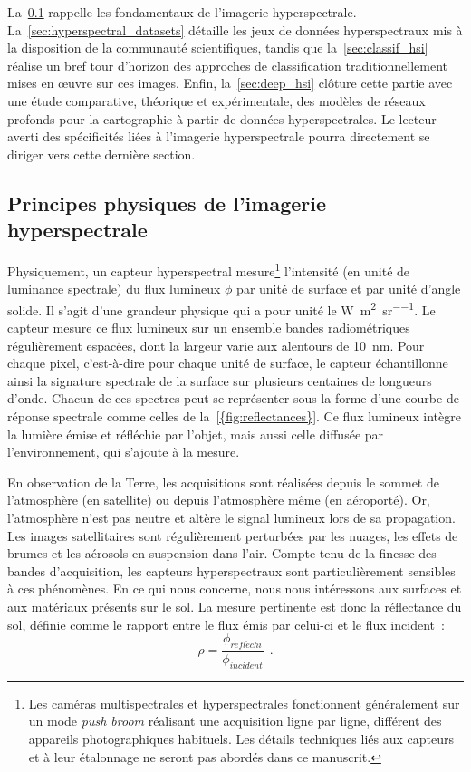 La~\cref{sec:principes_hsi} rappelle les fondamentaux de l'imagerie hyperspectrale. La~\cref{sec:hyperspectral_datasets} détaille les jeux de données hyperspectraux mis à la disposition de la communauté scientifiques, tandis que la~\cref{sec:classif_hsi} réalise un bref tour d'horizon des approches de classification traditionnellement mises en \oe{}uvre sur ces images. Enfin, la~\cref{sec:deep_hsi} clôture cette partie avec une étude comparative, théorique et expérimentale, des modèles de réseaux profonds pour la cartographie à partir de données hyperspectrales. Le lecteur averti des spécificités liées à l'imagerie hyperspectrale pourra directement se diriger vers cette dernière section.

\subsection{Principes physiques de l'imagerie hyperspectrale}
\label{sec:principes_hsi}

Physiquement, un capteur hyperspectral mesure\footnote{Les caméras multispectrales et hyperspectrales fonctionnent généralement sur un mode \emph{push broom} réalisant une acquisition ligne par ligne, différent des appareils photographiques habituels. Les détails techniques liés aux capteurs et à leur étalonnage ne seront pas abordés dans ce manuscrit.} l'intensité (en unité de luminance spectrale) du flux lumineux $\phi$ par unité de surface et par unité d'angle solide. Il s'agit d'une grandeur physique qui a pour unité le \si{\watt\per\square\meter\per\steradian}. Le capteur mesure ce flux lumineux sur un ensemble bandes radiométriques régulièrement espacées, dont la largeur varie aux alentours de \SI{10}{\nano\meter}. Pour chaque pixel, c'est-à-dire pour chaque unité de surface, le capteur échantillonne ainsi la signature spectrale de la surface sur plusieurs centaines de longueurs d'onde. Chacun de ces spectres peut se représenter sous la forme d'une courbe de réponse spectrale comme celles de la~\cref{{fig:reflectances}}. Ce flux lumineux intègre la lumière émise et réfléchie par l'objet, mais aussi celle diffusée par l'environnement, qui s'ajoute à la mesure.

En observation de la Terre, les acquisitions sont réalisées depuis le sommet de l'atmosphère (en satellite) ou depuis l'atmosphère même (en aéroporté). Or, l'atmosphère n'est pas neutre et altère le signal lumineux lors de sa propagation. Les images satellitaires sont régulièrement perturbées par les nuages, les effets de brumes et les aérosols en suspension dans l'air. Compte-tenu de la finesse des bandes d'acquisition, les capteurs hyperspectraux sont particulièrement sensibles à ces phénomènes. En ce qui nous concerne, nous nous intéressons aux surfaces et aux matériaux présents sur le sol. La mesure pertinente est donc la réflectance du sol, définie comme le rapport entre le flux émis par celui-ci et le flux incident~:
\begin{equation}
  \rho = \frac{\phi_{\mathit{r\acute{e}fl\acute{e}chi}}}{\phi_\mathit{incident}}~~.
\end{equation}

